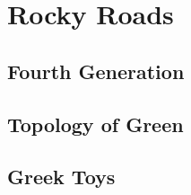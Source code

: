 \chapter{Rocky Roads}\margintoc
\section{Fourth Generation}
\lipsum[1-6]
\section{Topology of Green}
\lipsum[1-3]
\section{Greek Toys}
\lipsum[1-4]